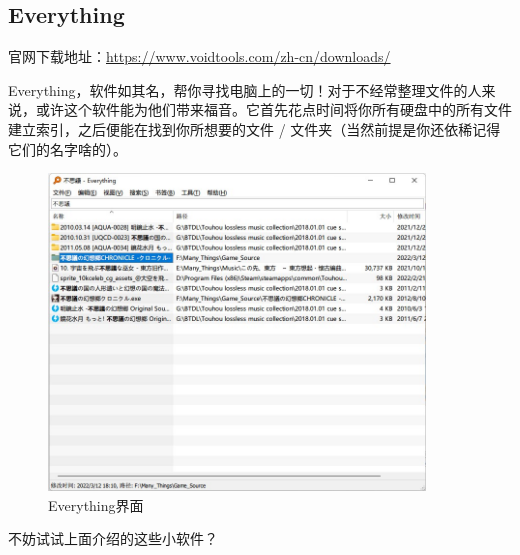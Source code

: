\subsection{Everything}

官网下载地址：\url{https://www.voidtools.com/zh-cn/downloads/}

Everything，软件如其名，帮你寻找电脑上的一切！对于不经常整理文件的人来说，或许这个软件能为他们带来福音。它首先花点时间将你所有硬盘中的所有文件建立索引，之后便能在找到你所想要的文件 / 文件夹（当然前提是你还依稀记得它们的名字啥的）。

\begin{figure}[htb!]
  \centering
  \includegraphics[width=10cm]{assets/Everything.jpg}
  \caption{Everything界面}
  \label{Everything}
\end{figure}

\practice

不妨试试上面介绍的这些小软件？